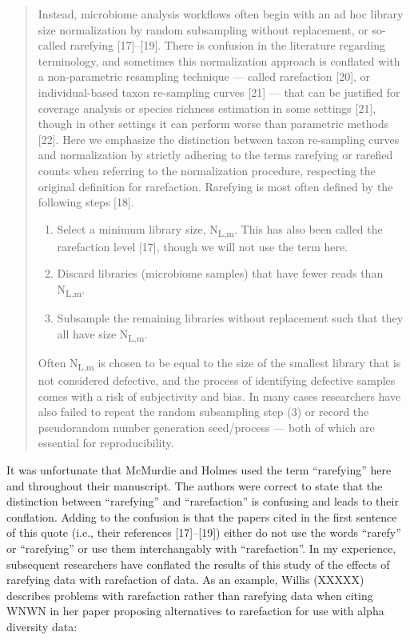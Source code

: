 \documentclass[
]{article}
\providecommand{\tightlist}{%
  \setlength{\itemsep}{0pt}\setlength{\parskip}{0pt}}
\begin{document}
\begin{quote}
Instead, microbiome analysis workflows often begin with an ad hoc
library size normalization by random subsampling without replacement, or
so-called rarefying {[}17{]}--{[}19{]}. There is confusion in the
literature regarding terminology, and sometimes this normalization
approach is conflated with a non-parametric resampling technique ---
called rarefaction {[}20{]}, or individual-based taxon re-sampling
curves {[}21{]} --- that can be justified for coverage analysis or
species richness estimation in some settings {[}21{]}, though in other
settings it can perform worse than parametric methods {[}22{]}. Here we
emphasize the distinction between taxon re-sampling curves and
normalization by strictly adhering to the terms rarefying or rarefied
counts when referring to the normalization procedure, respecting the
original definition for rarefaction. Rarefying is most often defined by
the following steps {[}18{]}.

\begin{enumerate}
\def\labelenumi{\arabic{enumi}.}
\tightlist
\item
  Select a minimum library size, N\textsubscript{L,m}. This has also
  been called the rarefaction level {[}17{]}, though we will not use the
  term here.
\item
  Discard libraries (microbiome samples) that have fewer reads than
  N\textsubscript{L,m}.
\item
  Subsample the remaining libraries without replacement such that they
  all have size N\textsubscript{L,m}.
\end{enumerate}

Often N\textsubscript{L,m} is chosen to be equal to the size of the
smallest library that is not considered defective, and the process of
identifying defective samples comes with a risk of subjectivity and
bias. In many cases researchers have also failed to repeat the random
subsampling step (3) or record the pseudorandom number generation
seed/process --- both of which are essential for reproducibility.
\end{quote}

It was unfortunate that McMurdie and Holmes used the term ``rarefying''
here and throughout their manuscript. The authors were correct to state
that the distinction between ``rarefying'' and ``rarefaction'' is
confusing and leads to their conflation. Adding to the confusion is that
the papers cited in the first sentence of this quote (i.e., their
references {[}17{]}--{[}19{]}) either do not use the words ``rarefy'' or
``rarefying'' or use them interchangably with ``rarefaction''. In my
experience, subsequent researchers have conflated the results of this
study of the effects of rarefying data with rarefaction of data. As an
example, Willis (XXXXX) describes problems with rarefaction rather than
rarefying data when citing WNWN in her paper proposing alternatives to
rarefaction for use with alpha diversity data:
\end{document}

